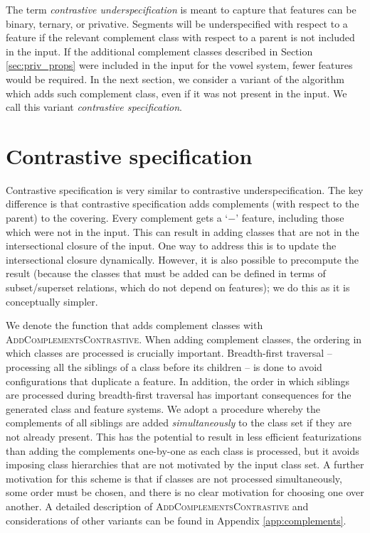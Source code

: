 \documentclass[11pt, oneside]{article}   	%
\begin{document}
The term \textit{contrastive underspecification} is meant to capture that features can be binary, ternary, or privative. Segments will be underspecified with respect to a feature if the relevant complement class with respect to a parent is not included in the input. If the additional complement classes described in Section \ref{sec:priv_props} were included in the input for the vowel system, fewer features would be required. In the next section, we consider a variant of the algorithm which adds such complement class, even if it was not present in the input. We call this variant \textit{contrastive specification}.

\FloatBarrier
\section{Contrastive specification}
\label{sec:contrastive}

Contrastive specification is very similar to contrastive underspecification. The key difference is that contrastive specification adds complements (with respect to the parent) to the covering. Every complement gets a `$-$' feature, including those which were not in the input. This can result in adding classes that are not in the intersectional closure of the input. One way to address this is to update the intersectional closure dynamically. However, it is also possible to precompute the result (because the classes that must be added can be defined in terms of subset/superset relations, which do not depend on features); we do this as it is conceptually simpler.

We denote the function that adds complement classes with \textsc{AddComplementsContrastive}. When adding complement classes, the ordering in which classes are processed is crucially important. Breadth-first traversal -- processing all the siblings of a class before its children -- is done to avoid configurations that duplicate a feature. In addition, the order in which siblings are processed during breadth-first traversal has important consequences for the generated class and feature systems. We adopt a procedure whereby the complements of all siblings are added \textit{simultaneously} to the class set if they are not already present. This has the potential to result in less efficient featurizations than adding the complements one-by-one as each class is processed, but it avoids imposing class hierarchies that are not motivated by the input class set. A further motivation for this scheme is that if classes are not processed simultaneously, some order must be chosen, and there is no clear motivation for choosing one over another. A detailed description of \textsc{AddComplementsContrastive} and considerations of other variants can be found in Appendix \ref{app:complements}.
\end{document}

